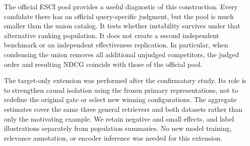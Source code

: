 The official ESCI pool provides a useful diagnostic of this construction. Every candidate there has an official query-specific judgment, but the pool is much smaller than the union catalog. It tests whether instability survives under that alternative ranking population. It does not create a second independent benchmark or an independent effectiveness replication. In particular, when condensing the union removes all additional unjudged competitors, the judged order and resulting NDCG coincide with those of the official pool.

The target-only extension was performed after the confirmatory study. Its role is to strengthen causal isolation using the frozen primary representations, not to redefine the original gate or select new winning configurations. The aggregate estimates cover the same three general retrievers and both datasets rather than only the motivating example. We retain negative and small effects, and label illustrations separately from population summaries. No new model training, relevance annotation, or encoder inference was needed for this extension.

